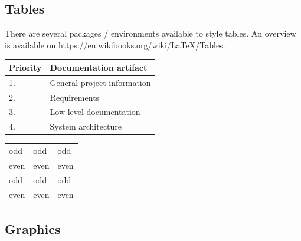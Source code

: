 \subsection{Tables}
\label{sec:tables}

There are several packages / environments available to style tables.
An overview is available on \url{https://en.wikibooks.org/wiki/LaTeX/Tables}.



\begin{table}[H]
\begin{center}
  \begin{tabular}{p{2cm}|p{8cm}}
	Priority &	Documentation artifact\\\hline
	1. &	General project information \\
	2. &	Requirements \\
	3. &	Low level documentation\\
	4. &	System architecture\\
  \end{tabular}
  \label{tab:importance_artifacts}
\end{center}
\end{table}


\begin{table}[H]
\begin{center}

  \begin{tabular}{lll}
    odd     & odd   & odd \\
    even    & even  & even\\
    odd     & odd   & odd \\
    even    & even  & even\\
  \end{tabular}
  \label{tab:colored}
\end{center}
\end{table}


\subsection{Graphics}
\label{sec:graphics}

